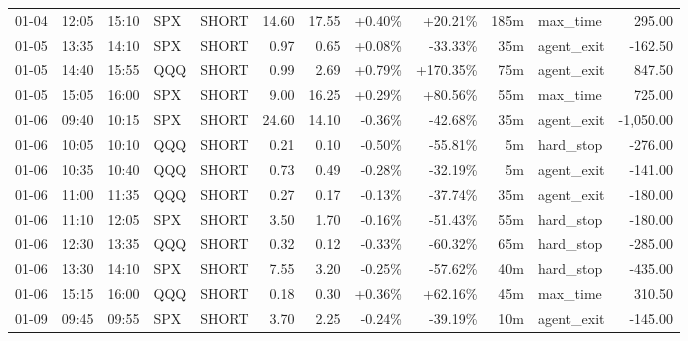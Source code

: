 \documentclass[11pt,a4paper,twoside]{article}
\begin{document}
\begin{center}
\begin{longtable}{>{\color{txtmain}}l l l l l r r r r r >{\color{txtmain}}l r}
01-04 & 12:05 & 15:10 & SPX & SHORT & 14.60 & 17.55 & \textcolor{wingreen}{+0.40\%} & \textcolor{wingreen}{+20.21\%} & 185m & max\_time & \textcolor{wingreen}{295.00} \\
01-05 & 13:35 & 14:10 & SPX & SHORT & 0.97 & 0.65 & \textcolor{wingreen}{+0.08\%} & \textcolor{lossred}{-33.33\%} & 35m & agent\_exit & \textcolor{lossred}{-162.50} \\
01-05 & 14:40 & 15:55 & QQQ & SHORT & 0.99 & 2.69 & \textcolor{wingreen}{+0.79\%} & \textcolor{wingreen}{+170.35\%} & 75m & agent\_exit & \textcolor{wingreen}{847.50} \\
01-05 & 15:05 & 16:00 & SPX & SHORT & 9.00 & 16.25 & \textcolor{wingreen}{+0.29\%} & \textcolor{wingreen}{+80.56\%} & 55m & max\_time & \textcolor{wingreen}{725.00} \\
01-06 & 09:40 & 10:15 & SPX & SHORT & 24.60 & 14.10 & \textcolor{lossred}{-0.36\%} & \textcolor{lossred}{-42.68\%} & 35m & agent\_exit & \textcolor{lossred}{-1,050.00} \\
01-06 & 10:05 & 10:10 & QQQ & SHORT & 0.21 & 0.10 & \textcolor{lossred}{-0.50\%} & \textcolor{lossred}{-55.81\%} & 5m & hard\_stop & \textcolor{lossred}{-276.00} \\
01-06 & 10:35 & 10:40 & QQQ & SHORT & 0.73 & 0.49 & \textcolor{lossred}{-0.28\%} & \textcolor{lossred}{-32.19\%} & 5m & agent\_exit & \textcolor{lossred}{-141.00} \\
01-06 & 11:00 & 11:35 & QQQ & SHORT & 0.27 & 0.17 & \textcolor{lossred}{-0.13\%} & \textcolor{lossred}{-37.74\%} & 35m & agent\_exit & \textcolor{lossred}{-180.00} \\
01-06 & 11:10 & 12:05 & SPX & SHORT & 3.50 & 1.70 & \textcolor{lossred}{-0.16\%} & \textcolor{lossred}{-51.43\%} & 55m & hard\_stop & \textcolor{lossred}{-180.00} \\
01-06 & 12:30 & 13:35 & QQQ & SHORT & 0.32 & 0.12 & \textcolor{lossred}{-0.33\%} & \textcolor{lossred}{-60.32\%} & 65m & hard\_stop & \textcolor{lossred}{-285.00} \\
01-06 & 13:30 & 14:10 & SPX & SHORT & 7.55 & 3.20 & \textcolor{lossred}{-0.25\%} & \textcolor{lossred}{-57.62\%} & 40m & hard\_stop & \textcolor{lossred}{-435.00} \\
01-06 & 15:15 & 16:00 & QQQ & SHORT & 0.18 & 0.30 & \textcolor{wingreen}{+0.36\%} & \textcolor{wingreen}{+62.16\%} & 45m & max\_time & \textcolor{wingreen}{310.50} \\
01-09 & 09:45 & 09:55 & SPX & SHORT & 3.70 & 2.25 & \textcolor{lossred}{-0.24\%} & \textcolor{lossred}{-39.19\%} & 10m & agent\_exit & \textcolor{lossred}{-145.00} \\

\end{longtable}
\end{center}
\end{document}
